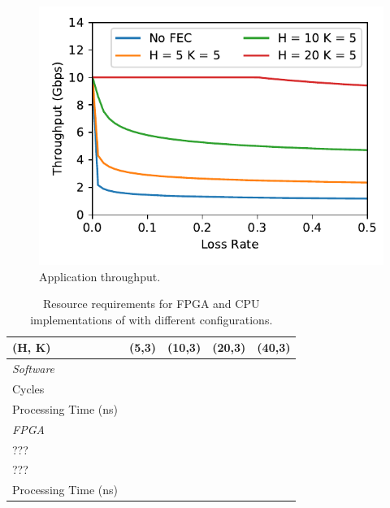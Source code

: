 \begin{figure}
  \centering
  \includegraphics[width=0.3\paperwidth]{fake_tput.pdf}
  \caption{\label{fig:app_tput} Application throughput.}
\end{figure}

\begin{table}
\begin{center}
\small
\begin{tabular}{ l l l l l } 
\toprule
(H, K) & (5,3) & (10,3) & (20,3) & (40,3) \\
\midrule
\emph{Software} & & & & \\
\cmidrule{1-1}
Cycles & & & & \\
Processing Time (ns) & & & & \\
\midrule
\emph{FPGA} & & & & \\
\cmidrule{1-1}
??? & & & & \\
??? & & & & \\
Processing Time (ns) & & & & \\
\bottomrule

\end{tabular}
\caption{Resource requirements for FPGA and CPU implementations of \OurSys with different configurations.}
\label{tab:microbenchmarks}
\end{center}
\end{table}



